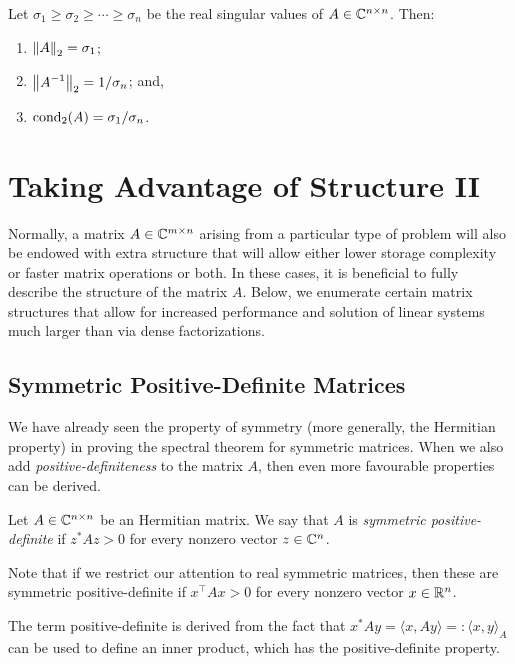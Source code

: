\begin{theorem}\label{theorem:SVD2normcond}
Let $\sigma_1\ge\sigma_2\ge\cdots\ge\sigma_n$ be the real singular values of $A\in\mathbb{C}^{n\times n}$. Then:
\begin{enumerate}
\item $\left\|{A}\right\|_2 = \sigma_1$;
\item $\displaystyle \left\|{A^{-1}}\right\|_2 = 1/\sigma_n$; and,
\item $\displaystyle \operatorname{cond}_2(A) = \sigma_1/\sigma_n$.
\end{enumerate}
\end{theorem}

\section{Taking Advantage of Structure II}

Normally, a matrix $A\in\mathbb{C}^{m\times n}$ arising from a particular type of problem will also be endowed with extra structure that will allow either lower storage complexity or faster matrix operations or both. In these cases, it is beneficial to fully describe the structure of the matrix $A$. Below, we enumerate certain matrix structures that allow for increased performance and solution of linear systems much larger than via dense factorizations.

\subsection{Symmetric Positive-Definite Matrices}

We have already seen the property of symmetry (more generally, the Hermitian property) in proving the spectral theorem for symmetric matrices. When we also add {\em positive-definiteness} to the matrix $A$, then even more favourable properties can be derived.

\begin{definition}
Let $A\in\mathbb{C}^{n\times n}$ be an Hermitian matrix. We say that $A$ is {\em symmetric positive-definite} if $z^*Az > 0$ for every nonzero vector $z\in\mathbb{C}^n$.
\end{definition}
Note that if we restrict our attention to real symmetric matrices, then these are symmetric positive-definite if $x^\top A x>0$ for every nonzero vector $x\in\mathbb{R}^n$.

The term positive-definite is derived from the fact that $x^*Ay = \langle x,Ay\rangle =: \langle x,y\rangle_A$ can be used to define an inner product, which has the positive-definite property.

